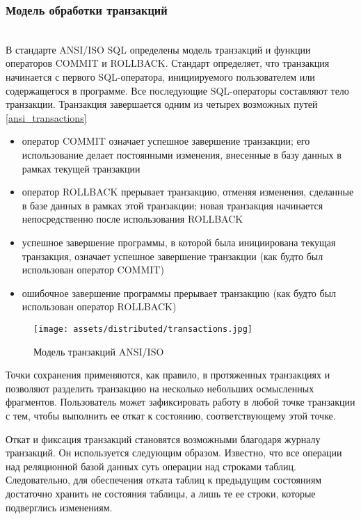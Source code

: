 \subsubsection{Модель обработки транзакций} ~\\
В стандарте ANSI/ISO SQL определены модель транзакций и функции операторов COMMIT и ROLLBACK. \autocite{AnsiSqlTrans}
Стандарт определяет, что транзакция начинается с первого SQL-оператора, инициируемого пользователем или содержащегося
в программе. Все последующие SQL-операторы составляют тело транзакции. Транзакция завершается одним из четырех
возможных путей \autoref{ansi_transactions}
\begin{itemize}
    \item оператор COMMIT означает успешное завершение транзакции; его использование делает постоянными изменения,
    внесенные в базу данных в рамках текущей транзакции
    \item оператор ROLLBACK прерывает транзакцию, отменяя изменения, сделанные в базе данных в рамках
    этой транзакции; новая транзакция начинается непосредственно после использования ROLLBACK
    \item успешное завершение программы, в которой была инициирована текущая транзакция,
    означает успешное завершение транзакции (как будто был использован оператор COMMIT)
    \item ошибочное завершение программы прерывает транзакцию (как будто был использован оператор ROLLBACK)
\end{itemize}

\begin{figure}[h!]
    \centering
    \texttt{[image: assets/distributed/transactions.jpg]}
    \caption{Модель транзакций ANSI/ISO}
	\label{ansi_transactions}
\end{figure}

Точки сохранения применяются, как правило, в протяженных транзакциях и позволяют разделить транзакцию на несколько
небольших осмысленных фрагментов. Пользователь может зафиксировать работу в любой точке транзакции с тем,
чтобы выполнить ее откат к состоянию, соответствующему этой точке.

Откат и фиксация транзакций становятся возможными благодаря журналу транзакций. Он используется следующим образом.
Известно, что все операции над реляционной базой данных суть операции над строками таблиц. Следовательно,
для обеспечения отката таблиц к предыдущим состояниям достаточно хранить не состояния таблицы, а лишь те
ее строки, которые подверглись изменениям.


